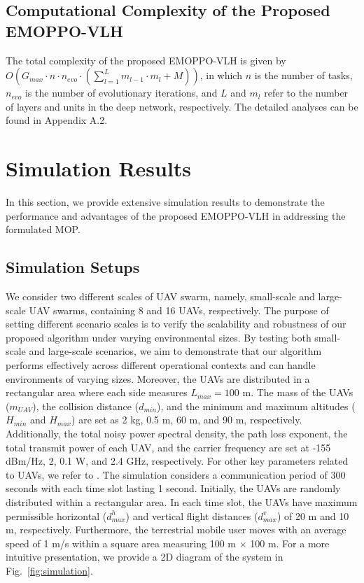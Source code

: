 \documentclass[10pt,journal,compsoc]{IEEEtran}
\begin{document}
\subsection{Computational Complexity of the Proposed EMOPPO-VLH}

\par The total complexity of the proposed EMOPPO-VLH is given by $O(G_{max} \cdot n \cdot n_{evo} \cdot (\sum_{l=1}^L m_{l-1} \cdot m_l + M))$, in which $n$ is the number of tasks, $n_{evo}$ is the number of evolutionary iterations, and $L$ and $m_l$ refer to the number of layers and units in the deep network, respectively. The detailed analyses can be found in Appendix A.2. 


\section{Simulation Results}
\label{sec:simulation results}

\par In this section, we provide extensive simulation results to demonstrate the performance and advantages of the proposed EMOPPO-VLH in addressing the formulated MOP.

\subsection{Simulation Setups}

\par We consider two different scales of UAV swarm, namely, small-scale and large-scale UAV swarms, containing 8 and 16 UAVs, respectively. The purpose of setting different scenario scales is to verify the scalability and robustness of our proposed algorithm under varying environmental sizes. By testing both small-scale and large-scale scenarios, we aim to demonstrate that our algorithm performs effectively across different operational contexts and can handle environments of varying sizes. Moreover, the UAVs are distributed in a rectangular area where each side measures $L_{max} = 100$ m. The mass of the UAVs ($m_{UAV}$), the collision distance ($d_{min}$), and the minimum and maximum altitudes ($H_{min}$ and $H_{max}$) are set as 2 kg, 0.5 m, 60 m, and 90 m, respectively. Additionally, the total noisy power spectral density, the path loss exponent, the total transmit power of each UAV, and the carrier frequency are set at -155 dBm/Hz, 2, 0.1 W, and 2.4 GHz, respectively. For other key parameters related to UAVs, we refer to \cite{sun2022secure}. The simulation considers a communication period of 300 seconds with each time slot lasting 1 second. Initially, the UAVs are randomly distributed within a rectangular area. In each time slot, the UAVs have maximum permissible horizontal ($d_{max}^h$) and vertical flight distances ($d_{max}^v$) of 20 m and 10 m, respectively. Furthermore, the terrestrial mobile user moves with an average speed of 1 m/s within a square area measuring 100 m $\times$ 100 m. For a more intuitive presentation, we provide a 2D diagram of the system in Fig.~\ref{fig:simulation}.
\end{document}
